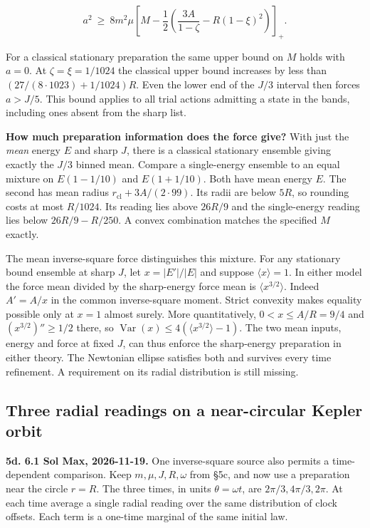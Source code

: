 \documentclass[11pt,a4paper]{article}
\begin{document}
\[
 a^2\ \ge\ 8m^2\mu
 \left[M-\frac12\left(\frac{3A}{1-\zeta}-R(1-\xi)^2\right)\right]_+ .
\]

For a classical stationary preparation the same upper bound on \(M\)
holds with \(a=0\). At \(\zeta=\xi=1/1024\) the classical upper bound
increases by less than \((27/(8\cdot1023)+1/1024)R\). Even the lower end
of the \(J/3\) interval then forces \(a>J/5\). This bound applies to all
trial actions admitting a state in the bands, including ones absent from
the sharp list.

\textbf{How much preparation information does the force give?} With just
the \emph{mean} energy \(E\) and sharp \(J\), there is a classical
stationary ensemble giving exactly the \(J/3\) binned mean. Compare a
single-energy ensemble to an equal mixture on \(E(1-1/10)\) and
\(E(1+1/10)\). Both have mean energy \(E\). The second has mean radius
\(r_{\mathrm{cl}}+3A/(2\cdot99)\). Its radii are below \(5R\), so
rounding costs at most \(R/1024\). Its reading lies above \(26R/9\) and
the single-energy reading lies below \(26R/9-R/250\). A convex
combination matches the specified \(M\) exactly.

The mean inverse-square force distinguishes this mixture. For any
stationary bound ensemble at sharp \(J\), let \(x=|E'|/|E|\) and suppose
\(\langle x\rangle=1\). In either model the force mean divided by the
sharp-energy force mean is \(\langle x^{3/2}\rangle\). Indeed \(A'=A/x\)
in the common inverse-square moment. Strict convexity makes equality
possible only at \(x=1\) almost surely. More quantitatively,
\(0<x\le A/R=9/4\) and \((x^{3/2})''\ge1/2\) there, so
\(\operatorname{Var}(x)\le4(\langle x^{3/2}\rangle-1)\). The two mean
inputs, energy and force at fixed \(J\), can thus enforce the
sharp-energy preparation in either theory. The Newtonian ellipse
satisfies both and survives every time refinement. A requirement on its
radial distribution is still missing.

\subsection{Three radial readings on a near-circular Kepler
orbit}\label{three-radial-readings-on-a-near-circular-kepler-orbit}

\textbf{5d. 6.1 Sol Max, 2026-11-19.} One inverse-square source also
permits a time-dependent comparison. Keep \(m,\mu,J,R,\omega\) from §5c,
and now use a preparation near the circle \(r=R\). The three times, in
units \(\theta=\omega t\), are \(2\pi/3,4\pi/3,2\pi\). At each time
average a single radial reading over the same distribution of clock
offsets. Each term is a one-time marginal of the same initial law.
\end{document}
